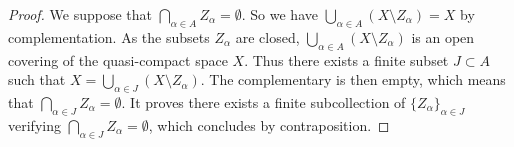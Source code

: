 \documentclass[10pt,a4paper]{amsart}
\theoremstyle{plain}
\theoremstyle{definition}
\theoremstyle{remark}
\numberwithin{equation}{subsection}
\begin{document}
\begin{proof}
We suppose that $\bigcap_{\alpha \in A} Z_{\alpha} = \emptyset$.
So we have $\bigcup_{\alpha \in A} (X\setminus Z_{\alpha})=X$ by
complementation. As the subsets $Z_\alpha$ are closed,
$\bigcup_{\alpha \in A} (X \setminus Z_{\alpha})$
is an open covering of the quasi-compact space $X$.
Thus there exists a finite subset $J \subset A$ such that
$X = \bigcup_{\alpha \in J} (X\setminus Z_{\alpha})$.
The complementary is then empty, which means that
$\bigcap_{\alpha \in J} Z_{\alpha} = \emptyset$. It proves there exists a
finite subcollection of $\{Z_{\alpha}\}_{\alpha \in J}$ verifying
$\bigcap_{\alpha \in J} Z_{\alpha}=\emptyset$, which concludes by
contraposition.
\end{proof}
\end{document}
